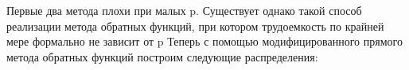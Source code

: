 \documentclass[a4paper,12pt, oneside]{book}
\begin{document}
{{\begin{center}
	\begin{minipage}[h]{0.4\linewidth}
	\end{minipage}
\end{center}


\vspace{15mm}
Первые два метода плохи при малых p. Существует однако такой способ реализации метода обратных функций, при котором трудоемкость по крайней мере формально не зависит от p
Теперь с помощью модифицированного прямого метода обратных функций построим следующие распределения:

}}
\end{document}

